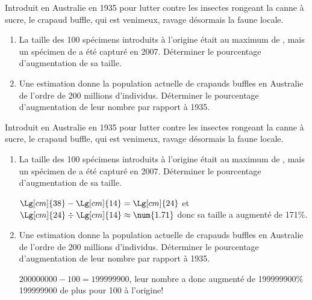 \begin{exercice*}
    Introduit en Australie en 1935 pour lutter contre les insectes rongeant la canne à sucre, le crapaud buffle, qui est venimeux, ravage désormais la faune locale.
    \begin{enumerate}
        \item La taille des 100 spécimens introduits à l'origine était au maximum de , mais un spécimen de  a été capturé en 2007.
        Déterminer le pourcentage d'augmentation de sa taille.
        \item Une estimation donne la population actuelle de crapauds buffles en Australie de l'ordre de 200 millions d'individus.
        Déterminer le pourcentage d'augmentation de leur nombre par rapport à 1935.
    \end{enumerate}
\end{exercice*}
\begin{corrige}
    Introduit en Australie en 1935 pour lutter contre les insectes rongeant la canne à sucre, le crapaud buffle, qui est venimeux, ravage désormais la faune locale.

    \begin{enumerate}
        \item La taille des 100 spécimens introduits à l'origine était au maximum de , mais un spécimen de  a été capturé en 2007.
        Déterminer le pourcentage d'augmentation de sa taille.

        {\color{red} $\Lg[cm]{38}-\Lg[cm]{14}=\Lg[cm]{24}$ et $\Lg[cm]{24}\div\Lg[cm]{14}\approx\num{1.71}$ donc sa taille a augmenté de 171\%.}
    \end{enumerate}
    \Coupe
    \begin{enumerate}
        \setcounter{enumi}{1}
        \item Une estimation donne la population actuelle de crapauds buffles en Australie de l'ordre de 200 millions d'individus.
        Déterminer le pourcentage d'augmentation de leur nombre par rapport à 1935.

        {\color{red} $\num{200 000 000}-100=\num{199 999 900}$, leur nombre a donc augmenté de \num{199 999 900}\% \num{199 999 900} de plus pour 100 à l'origine!}
    \end{enumerate}
\end{corrige}
